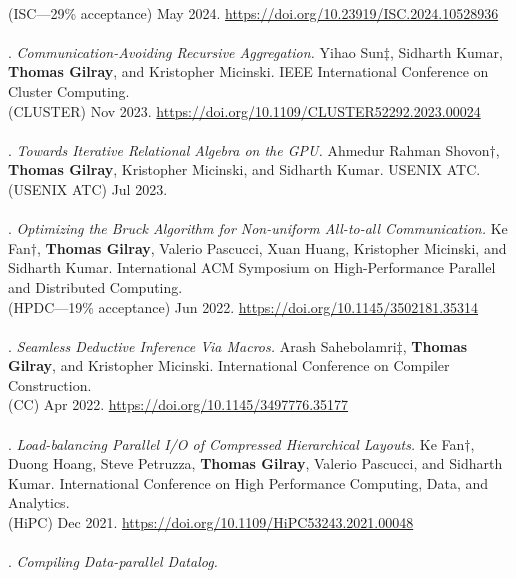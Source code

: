 \\(ISC---29\% acceptance) May 2024. \url{https://doi.org/10.23919/ISC.2024.10528936}
\\ \vspace{-0.1cm}\\
\paper. \textit{Communication-Avoiding Recursive Aggregation.}
Yihao Sun$\ddagger$, Sidharth Kumar, \textbf{Thomas Gilray}, and Kristopher Micinski.
IEEE International Conference on Cluster Computing.
\\(CLUSTER) Nov 2023. \url{https://doi.org/10.1109/CLUSTER52292.2023.00024}
\\ \vspace{-0.1cm}\\
\paper. \textit{Towards Iterative Relational Algebra on the GPU.}
Ahmedur Rahman Shovon$\dagger$, \textbf{Thomas Gilray}, Kristopher Micinski, and Sidharth Kumar.
USENIX ATC.
\\(USENIX ATC) Jul 2023.
\\ \vspace{-0.1cm}\\
\paper. \textit{Optimizing the Bruck Algorithm for Non-uniform All-to-all Communication.}
Ke Fan$\dagger$, \textbf{Thomas Gilray}, Valerio Pascucci, Xuan Huang, Kristopher Micinski, and Sidharth Kumar.
International ACM Symposium on High-Performance Parallel and Distributed Computing.
\\(HPDC---19\% acceptance) Jun 2022. \url{https://doi.org/10.1145/3502181.35314}
\\ \vspace{-0.1cm}\\
\paper. \textit{Seamless Deductive Inference Via Macros.}
Arash Sahebolamri$\ddagger$, \textbf{Thomas Gilray}, and Kristopher Micinski.
International Conference on Compiler Construction.
\\(CC) Apr 2022. \url{https://doi.org/10.1145/3497776.35177}
\\ \vspace{-0.1cm}\\
\paper. \textit{Load-balancing Parallel I/O of Compressed Hierarchical Layouts.}
Ke Fan$\dagger$, Duong Hoang, Steve Petruzza, \textbf{Thomas Gilray}, Valerio Pascucci, and Sidharth Kumar.
International Conference on High Performance Computing, Data, and Analytics.
\\(HiPC) Dec 2021. \url{https://doi.org/10.1109/HiPC53243.2021.00048}
\\ \vspace{-0.1cm}\\
\paper. \textit{Compiling Data-parallel Datalog.}
